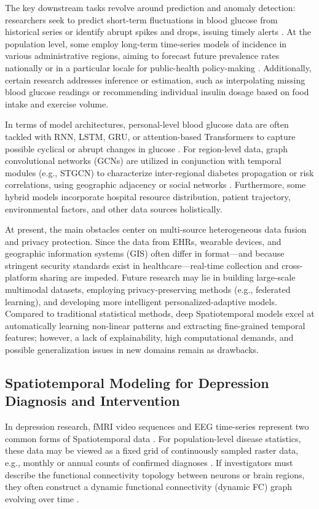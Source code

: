 \documentclass[acmsmall]{acmart}
\begin{document}
The key downstream tasks revolve around prediction and anomaly detection: researchers seek to predict short-term fluctuations in blood glucose from historical series or identify abrupt spikes and drops, issuing timely alerts \cite{2}. At the population level, some employ long-term time-series models of incidence in various administrative regions, aiming to forecast future prevalence rates nationally or in a particular locale for public-health policy-making \cite{3}. Additionally, certain research addresses inference or estimation, such as interpolating missing blood glucose readings or recommending individual insulin dosage based on food intake and exercise volume.

In terms of model architectures, personal-level blood glucose data are often tackled with RNN, LSTM, GRU, or attention-based Transformers to capture possible cyclical or abrupt changes in glucose \cite{2}. For region-level data, graph convolutional networks (GCNs) are utilized in conjunction with temporal modules (e.g., STGCN) to characterize inter-regional diabetes propagation or risk correlations, using geographic adjacency or social networks \cite{3}. Furthermore, some hybrid models incorporate hospital resource distribution, patient trajectory, environmental factors, and other data sources holistically.

At present, the main obstacles center on multi-source heterogeneous data fusion and privacy protection. Since the data from EHRs, wearable devices, and geographic information systems (GIS) often differ in format—and because stringent security standards exist in healthcare—real-time collection and cross-platform sharing are impeded. Future research may lie in building large-scale multimodal datasets, employing privacy-preserving methods (e.g., federated learning), and developing more intelligent personalized-adaptive models. Compared to traditional statistical methods, deep Spatiotemporal models excel at automatically learning non-linear patterns and extracting fine-grained temporal features; however, a lack of explainability, high computational demands, and possible generalization issues in new domains remain as drawbacks.

\subsection{Spatiotemporal Modeling for Depression Diagnosis and Intervention}
In depression research, fMRI video sequences and EEG time-series represent two common forms of Spatiotemporal data \cite{2,4,5}. For population-level disease statistics, these data may be viewed as a fixed grid of continuously sampled raster data, e.g., monthly or annual counts of confirmed diagnoses \cite{3}. If investigators must describe the functional connectivity topology between neurons or brain regions, they often construct a dynamic functional connectivity (dynamic FC) graph evolving over time \cite{4,5}.
\end{document}
